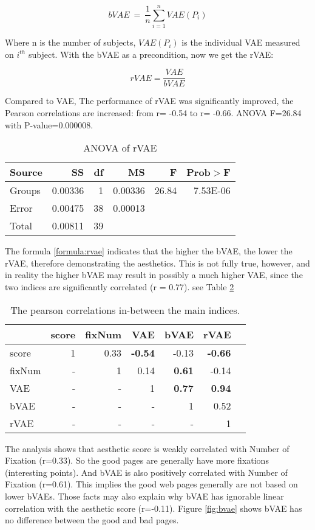 $$bVAE~=~\frac{1}{n}\sum_{i=1}^n VAE(P_i)$$

Where n is the number of subjects, $VAE(P_i)$ is the individual VAE measured on $i^{th}$ subject.
With the bVAE as a precondition, now we get the rVAE:

\begin{equation}
rVAE = \frac{VAE}{bVAE}
\label{formula:rvae}
\end{equation}

Compared to VAE, The performance of rVAE was significantly improved, the Pearson correlations are increased: from r= -0.54 to r= -0.66. ANOVA F=26.84 with P-value=0.000008.

\begin{table}[H]
\begin{tabular}{lrrrrr}
  Source&SS&df&MS&F&Prob$>$F\\ \hline
  Groups&0.00336&1&0.00336&26.84&7.53E-06\\
  Error&0.00475&38&0.00013&&\\
  Total&0.00811&39&&&\\
\end{tabular}
\caption{ANOVA of rVAE}
\label{tab:ANOVA-rvae-dw}
\end{table}

The formula \ref{formula:rvae} indicates that the higher the bVAE, the lower the rVAE, therefore demonstrating the aesthetics. This is not fully true, however, and in reality the higher bVAE may result in possibly a much higher VAE, since the two indices are significantly correlated (r = 0.77). see Table \ref{tab:corr}

\begin{table}[H]
\begin{tabular}{l|rrrrrr}
        &score&fixNum&VAE&bVAE&rVAE\\ \hline
  score &1&0.33&\bfseries{-0.54}&-0.13&\bfseries{-0.66}\\
  fixNum&-&1&0.14&\bfseries{0.61}&-0.14\\
  VAE&-&-&1&\bfseries{0.77}&\bfseries{0.94}\\
  bVAE&-&-&-&1&0.52\\
  rVAE&-&-&-&-&1\\
\end{tabular}
\caption{The pearson correlations in-between the main indices.}
\label{tab:corr}
\end{table}

The analysis shows that aesthetic score is weakly correlated with Number of Fixation (r=0.33). So the good pages are generally have more fixations (interesting points). And bVAE is also positively correlated with Number of Fixation (r=0.61). This implies the good web pages generally are not based on lower bVAEs. Those facts may also explain why bVAE has ignorable linear correlation with the aesthetic score (r=-0.11). Figure \ref{fig:bvae} shows bVAE has no difference between the good and bad pages.

